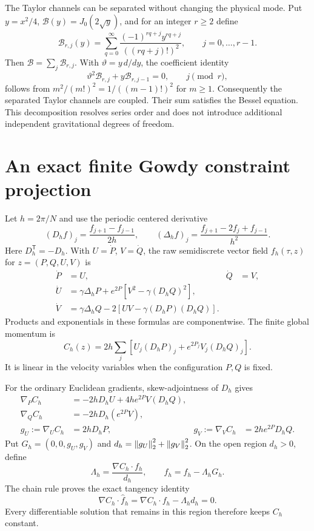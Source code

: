 The Taylor channels can be separated without changing the physical
mode. Put $y=x^2/4$, $\mathcal B(y)=J_0(2\sqrt y)$, and for an integer
$r\geq2$ define
\[
 \mathcal B_{r,j}(y)=\sum_{q=0}^{\infty}
 \frac{(-1)^{rq+j}y^{rq+j}}{((rq+j)!)^2},
 \qquad j=0,\ldots,r-1.
\]
Then $\mathcal B=\sum_j\mathcal B_{r,j}$. With
$\vartheta=y\,d/dy$, the coefficient identity
\[
 \vartheta^2\mathcal B_{r,j}+y\mathcal B_{r,j-1}=0,
 \qquad j\pmod r,
\]
follows from $m^2/(m!)^2=1/((m-1)!)^2$ for $m\geq1$.
Consequently the separated Taylor channels are coupled. Their sum
satisfies the Bessel equation. This decomposition resolves series
order and does not introduce additional independent gravitational
degrees of freedom.



\section{An exact finite Gowdy constraint projection}
\label{c:core:gowdy-projection}

Let $h=2\pi/N$ and use the periodic centered derivative
\[
 (D_hf)_j=\frac{f_{j+1}-f_{j-1}}{2h},\qquad
 (\Delta_hf)_j=\frac{f_{j+1}-2f_j+f_{j-1}}{h^2}.
\]
Here $D_h^{\mathsf T}=-D_h$. With $U=\dot P$, $V=\dot Q$, the raw
semidiscrete vector field $f_h(\tau,z)$ for $z=(P,Q,U,V)$ is
\begin{align}
 \dot P&=U,&\dot Q&=V,\nonumber\\
 \dot U&=\gamma\Delta_hP+e^{2P}[V^2-\gamma(D_hQ)^2],\nonumber\\
 \dot V&=\gamma\Delta_hQ-2[UV-\gamma(D_hP)(D_hQ)].
 \label{c:core:gowdy-raw}
\end{align}
Products and exponentials in these formulas are componentwise.
The finite global momentum is
\begin{equation}
 C_h(z)=2h\sum_j[U_j(D_hP)_j+e^{2P_j}V_j(D_hQ)_j].
 \label{c:core:gowdy-momentum}
\end{equation}
It is linear in the velocity variables when the configuration $P,Q$
is fixed.

For the ordinary Euclidean gradients, skew-adjointness of $D_h$ gives
\begin{align*}
 \nabla_PC_h&=-2hD_hU+4h e^{2P}V(D_hQ),\\
 \nabla_QC_h&=-2hD_h(e^{2P}V),\\
 g_U:=\nabla_UC_h&=2hD_hP,
 &g_V:=\nabla_VC_h&=2h e^{2P}D_hQ.
\end{align*}
Put $G_h=(0,0,g_U,g_V)$ and $d_h=\left\lVert g_U\right\rVert_2^2+\left\lVert g_V\right\rVert_2^2$.
On the open region $d_h>0$, define
\[
 \Lambda_h=\frac{\nabla C_h\cdot f_h}{d_h},\qquad
 \widehat f_h=f_h-\Lambda_hG_h.
\]
The chain rule proves the exact tangency identity
\[
 \nabla C_h\cdot\widehat f_h
 =\nabla C_h\cdot f_h-\Lambda_hd_h=0.
\]
Every differentiable solution that remains in this region therefore
keeps $C_h$ constant.


